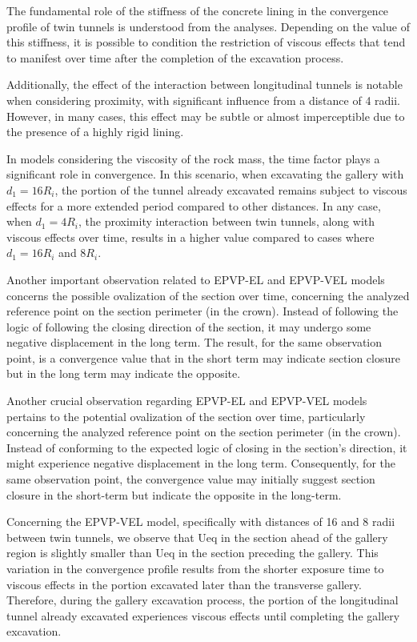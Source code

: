 \documentclass[a4paper,fleqn]{cas-sc}
\begin{document}
The fundamental role of the stiffness of the concrete lining in the convergence profile of twin tunnels is understood from the analyses. Depending on the value of this stiffness, it is possible to condition the restriction of viscous effects that tend to manifest over time after the completion of the excavation process.

Additionally, the effect of the interaction between longitudinal tunnels is notable when considering proximity, with significant influence from a distance of 4 radii. However, in many cases, this effect may be subtle or almost imperceptible due to the presence of a highly rigid lining.

In models considering the viscosity of the rock mass, the time factor plays a significant role in convergence. In this scenario, when excavating the gallery with $d_1 = 16R_i$, the portion of the tunnel already excavated remains subject to viscous effects for a more extended period compared to other distances. In any case, when $d_1 = 4R_i$, the proximity interaction between twin tunnels, along with viscous effects over time, results in a higher value compared to cases where $d_1 = 16R_i$ and $8R_i$.

Another important observation related to EPVP-EL and EPVP-VEL models concerns the possible ovalization of the section over time, concerning the analyzed reference point on the section perimeter (in the crown). Instead of following the logic of following the closing direction of the section, it may undergo some negative displacement in the long term. The result, for the same observation point, is a convergence value that in the short term may indicate section closure but in the long term may indicate the opposite.

Another crucial observation regarding EPVP-EL and EPVP-VEL models pertains to the potential ovalization of the section over time, particularly concerning the analyzed reference point on the section perimeter (in the crown). Instead of conforming to the expected logic of closing in the section's direction, it might experience negative displacement in the long term. Consequently, for the same observation point, the convergence value may initially suggest section closure in the short-term but indicate the opposite in the long-term.

Concerning the EPVP-VEL model, specifically with distances of 16 and 8 radii between twin tunnels, we observe that Ueq in the section ahead of the gallery region is slightly smaller than Ueq in the section preceding the gallery. This variation in the convergence profile results from the shorter exposure time to viscous effects in the portion excavated later than the transverse gallery. Therefore, during the gallery excavation process, the portion of the longitudinal tunnel already excavated experiences viscous effects until completing the gallery excavation. 
\end{document}
